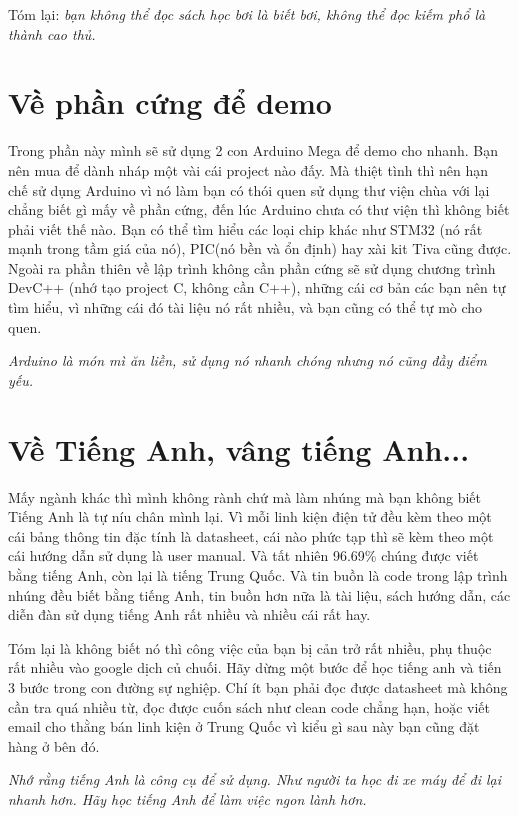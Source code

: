 Tóm lại: \textit{bạn không thể đọc sách học bơi là biết bơi, không thể đọc kiếm phổ là thành cao thủ.}
\section{Về phần cứng để demo}

Trong phần này mình sẽ sử dụng 2 con Arduino Mega để demo cho nhanh. Bạn nên mua để dành nháp một vài cái project nào đấy. Mà thiệt tình thì nên hạn chế sử dụng Arduino vì nó làm bạn có thói quen sử dụng thư viện chùa với lại chẳng biết gì mấy về phần cứng, đến lúc Arduino chưa có thư viện thì không biết phải viết thế nào. Bạn có thể tìm hiểu các loại chip khác như STM32 (nó rất mạnh trong tầm giá của nó), PIC(nó bền và ổn định) hay xài kit Tiva cũng được. Ngoài ra phần thiên về lập trình không cần phần cứng sẽ sử dụng chương trình DevC++ (nhớ tạo project C, không cần C++), những cái cơ bản các bạn nên tự tìm hiểu, vì những cái đó tài liệu nó rất nhiều, và bạn cũng có thể tự mò cho quen.

\textit{Arduino là món mì ăn liền, sử dụng nó nhanh chóng nhưng nó cũng đầy điểm yếu.}
\section{Về Tiếng Anh, vâng tiếng Anh...}
    
Mấy ngành khác thì mình không rành chứ mà làm nhúng mà bạn không biết Tiếng Anh là tự níu chân mình lại. Vì mỗi linh kiện điện tử đều kèm theo một cái bảng thông tin đặc tính là datasheet, cái nào phức tạp thì sẽ kèm theo một cái hướng dẫn sử dụng là user manual. Và tất nhiên 96.69\% chúng được viết bằng tiếng Anh, còn lại là tiếng Trung Quốc. Và tin buồn là code trong lập trình nhúng đều biết bằng tiếng Anh, tin buồn hơn nữa là tài liệu, sách hướng dẫn, các diễn đàn sử dụng tiếng Anh rất nhiều và nhiều cái rất hay.
    
Tóm lại là không biết nó thì công việc của bạn bị cản trở rất nhiều, phụ thuộc rất nhiều vào google dịch củ chuối. Hãy dừng một bước để học tiếng anh và tiến 3 bước trong con đường sự nghiệp. Chí ít bạn phải đọc được datasheet mà không cần tra quá nhiều từ, đọc được cuốn sách như clean code chẳng hạn, hoặc viết email cho thằng bán linh kiện ở Trung Quốc vì kiểu gì sau này bạn cũng đặt hàng ở bên đó.
    
\textit{Nhớ rằng tiếng Anh là công cụ để sử dụng. Như người ta học đi xe máy để đi lại nhanh hơn. Hãy học tiếng Anh để làm việc ngon lành hơn.}

